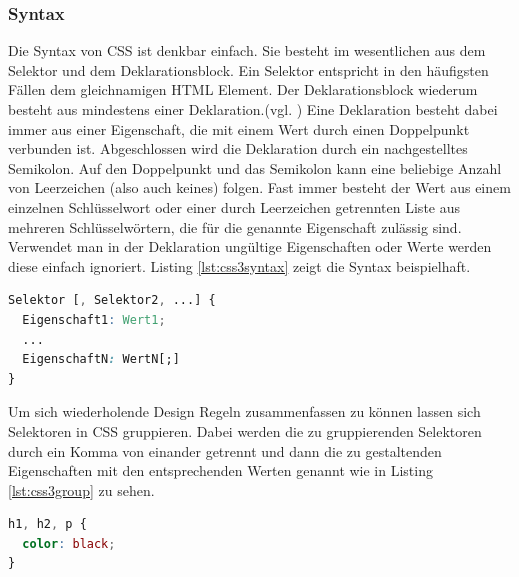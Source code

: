 \subsubsection{Syntax} Die Syntax von CSS ist denkbar einfach. Sie besteht im wesentlichen aus dem Selektor und dem Deklarationsblock. Ein Selektor entspricht in den häufigsten Fällen dem gleichnamigen HTML Element. Der Deklarationsblock wiederum besteht aus mindestens einer Deklaration.(vgl. \cite[S.26]{MeyeCasc2005}) \glqq Eine Deklaration besteht dabei immer aus einer Eigenschaft, die mit einem Wert durch einen Doppelpunkt verbunden ist. Abgeschlossen wird die Deklaration durch ein nachgestelltes Semikolon. Auf den Doppelpunkt und das Semikolon kann eine beliebige Anzahl von Leerzeichen (also auch keines) folgen. Fast immer besteht der Wert aus einem einzelnen Schlüsselwort oder einer durch Leerzeichen getrennten Liste aus mehreren Schlüsselwörtern, die für die genannte Eigenschaft zulässig sind.\grqq{}\cite[S.28]{MeyeCasc2005} Verwendet man in der Deklaration ungültige Eigenschaften oder Werte werden diese einfach ignoriert. Listing \ref{lst:css3syntax} zeigt die Syntax beispielhaft.

\vspace{1em}
\begin{lstlisting}[language=CSS, caption=CSS3 Syntax Beispiel, label=lst:css3syntax]
Selektor [, Selektor2, ...] {
  Eigenschaft1: Wert1;
  ...
  EigenschaftN: WertN[;]
}
\end{lstlisting}

Um sich wiederholende Design Regeln zusammenfassen zu können lassen sich Selektoren in CSS gruppieren. Dabei werden die zu gruppierenden Selektoren durch ein Komma von einander getrennt und dann die zu gestaltenden Eigenschaften mit den entsprechenden Werten genannt wie in Listing \ref{lst:css3group} zu sehen.

\vspace{1em}
\begin{lstlisting}[language=CSS, caption=CSS3 Gruppierung, label=lst:css3group]
h1, h2, p {
  color: black;
}
\end{lstlisting}

